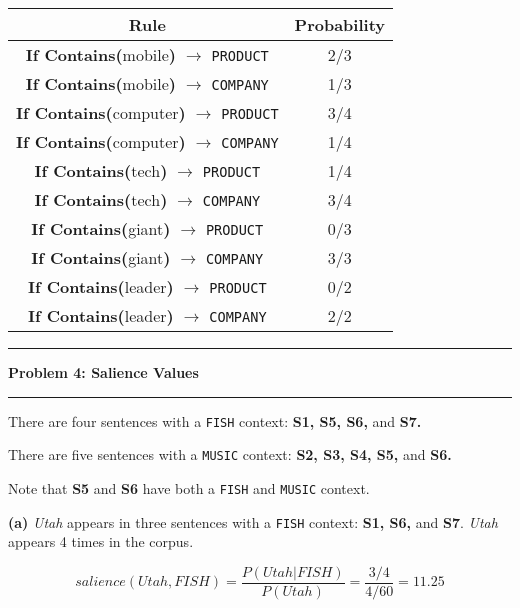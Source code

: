 \documentclass[11pt]{article}
\newcommand\question[2]{\vspace{.25in}\hrule\textbf{#1: #2}\vspace{.5em}\hrule\vspace{.10in}}
\renewcommand\part[1]{\vspace{.10in}\textbf{(#1)}}
\begin{document}
 \begin{table}[H]
\centering
{\renewcommand{\arraystretch}{1.4}%
\begin{tabular}{| c | c |}
\hline
\textbf{Rule} & \textbf{Probability}\\
\hline
\textbf{If Contains(}mobile\textbf{)} $\rightarrow$ {\tt PRODUCT} & 2/3\\ \hline
\textbf{If Contains(}mobile\textbf{)} $\rightarrow$ {\tt COMPANY} & 1/3\\ \hline
\textbf{If Contains(}computer\textbf{)} $\rightarrow$ {\tt PRODUCT} & 3/4\\ \hline
\textbf{If Contains(}computer\textbf{)} $\rightarrow$ {\tt COMPANY} & 1/4\\ \hline
\textbf{If Contains(}tech\textbf{)} $\rightarrow$ {\tt PRODUCT} & 1/4\\ \hline
\textbf{If Contains(}tech\textbf{)} $\rightarrow$ {\tt COMPANY} & 3/4\\ \hline
\textbf{If Contains(}giant\textbf{)} $\rightarrow$ {\tt PRODUCT} & 0/3\\ \hline
\textbf{If Contains(}giant\textbf{)} $\rightarrow$ {\tt COMPANY} & 3/3\\ \hline
\textbf{If Contains(}leader\textbf{)} $\rightarrow$ {\tt PRODUCT} & 0/2\\ \hline
\textbf{If Contains(}leader\textbf{)} $\rightarrow$ {\tt COMPANY} & 2/2\\ \hline
\end{tabular}}
\end{table}

\question{Problem 4}{Salience Values}
There are four sentences with a {\tt FISH} context: \textbf{S1, S5, S6,} and \textbf{S7.}

There are five sentences with a {\tt MUSIC} context: \textbf{S2, S3, S4, S5,} and \textbf{S6.}

Note that \textbf{S5} and \textbf{S6} have both a {\tt FISH} and {\tt MUSIC} context.

\part{a} \textit{Utah} appears in three sentences with a {\tt FISH} context: \textbf{S1, S6,} and \textbf{S7}. \textit{Utah} appears 4 times in the corpus.

$$salience(Utah, FISH) = \frac{P(Utah | FISH)}{P(Utah)} = \frac{3/4}{4/60} = 11.25$$

\end{document}
